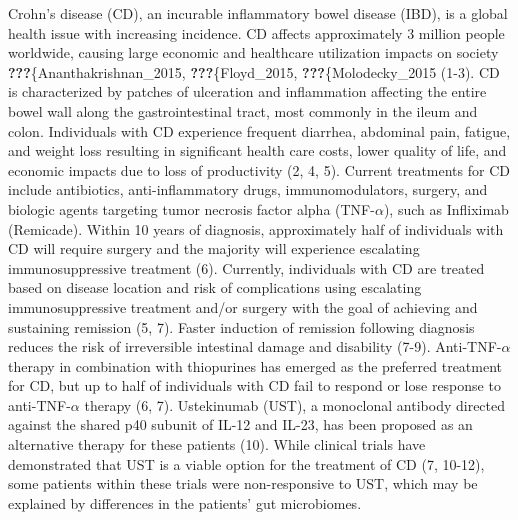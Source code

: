 \documentclass[11pt,]{article}
\begin{document}
Crohn's disease (CD), an incurable inflammatory bowel disease (IBD), is
a global health issue with increasing incidence. CD affects
approximately 3 million people worldwide, causing large economic and
healthcare utilization impacts on society
\textbf{???}\{Ananthakrishnan\_2015, \textbf{???}\{Floyd\_2015,
\textbf{???}\{Molodecky\_2015 (1-3). CD is characterized by patches of
ulceration and inflammation affecting the entire bowel wall along the
gastrointestinal tract, most commonly in the ileum and colon.
Individuals with CD experience frequent diarrhea, abdominal pain,
fatigue, and weight loss resulting in significant health care costs,
lower quality of life, and economic impacts due to loss of productivity
(2, 4, 5). Current treatments for CD include antibiotics,
anti-inflammatory drugs, immunomodulators, surgery, and biologic agents
targeting tumor necrosis factor alpha (TNF-\({\alpha}\)), such as
Infliximab (Remicade). Within 10 years of diagnosis, approximately half
of individuals with CD will require surgery and the majority will
experience escalating immunosuppressive treatment (6). Currently,
individuals with CD are treated based on disease location and risk of
complications using escalating immunosuppressive treatment and/or
surgery with the goal of achieving and sustaining remission (5, 7).
Faster induction of remission following diagnosis reduces the risk of
irreversible intestinal damage and disability (7-9).
Anti-TNF-\({\alpha}\) therapy in combination with thiopurines has
emerged as the preferred treatment for CD, but up to half of individuals
with CD fail to respond or lose response to anti-TNF-\({\alpha}\)
therapy (6, 7). Ustekinumab (UST), a monoclonal antibody directed
against the shared p40 subunit of IL-12 and IL-23, has been proposed as
an alternative therapy for these patients (10). While clinical trials
have demonstrated that UST is a viable option for the treatment of CD
(7, 10-12), some patients within these trials were non-responsive to
UST, which may be explained by differences in the patients' gut
microbiomes.
\end{document}
